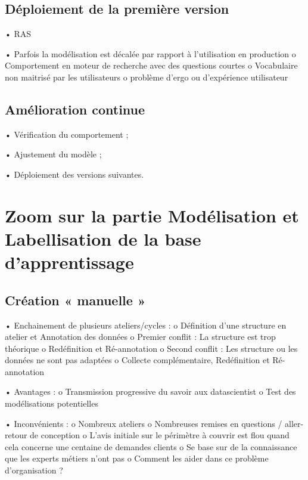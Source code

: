         \subsection{Déploiement de la première version}

            •	RAS

            •	Parfois la modélisation est décalée par rapport à l'utilisation en production
                o	Comportement en moteur de recherche avec des questions courtes
                o	Vocabulaire non maitrisé par les utilisateurs
                o	problème d'ergo ou d'expérience utilisateur

        \subsection{Amélioration continue}

            •	Vérification du comportement ;

            •	Ajustement du modèle ;

            •	Déploiement des versions suivantes.

    \section{Zoom sur la partie Modélisation et Labellisation de la base d'apprentissage}

        \subsection{Création « manuelle »}

            •	Enchainement de plusieurs ateliers/cycles :
                o	Définition d’une structure en atelier et Annotation des données
                o	Premier conflit : La structure est trop théorique
                o	Redéfinition et Ré-annotation
                o	Second conflit : Les structure ou les données ne sont pas adaptées
                o	Collecte complémentaire, Redéfinition et Ré-annotation

            •	Avantages :
                o	Transmission progressive du savoir aux datascientist
                o	Test des modélisations potentielles

            •	Inconvénients :
                o	Nombreux ateliers
                o	Nombreuses remises en questions / aller-retour de conception
                o	L'avis initiale sur le périmètre à couvrir est flou quand cela concerne une centaine de demandes clients
                o	Se base sur de la connaissance que les experts métiers n’ont pas
                o	Comment les aider dans ce problème d’organisation ?

